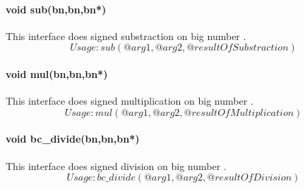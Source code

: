 
\paragraph{void sub(bn,bn,bn*)} This interface does signed substraction on big number .
$$Usage : sub(@arg1,@arg2,@resultOfSubstraction)  $$ 


\paragraph{void mul(bn,bn,bn*)} This interface does signed multiplication on big number .
$$Usage : mul(@arg1,@arg2,@resultOfMultiplication)  $$ 


\paragraph{void bc\_divide(bn,bn,bn*)} This interface does signed division on big number .
$$Usage : bc\_divide(@arg1,@arg2,@resultOfDivision)  $$ 

